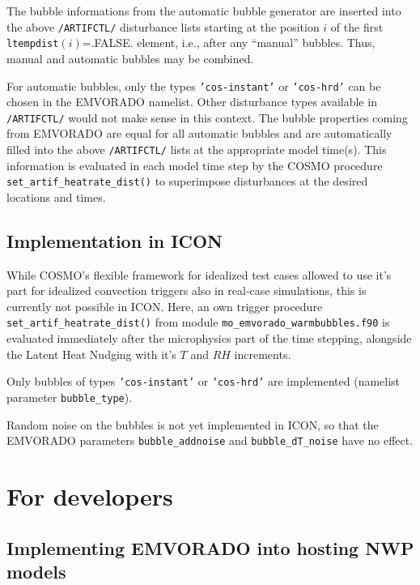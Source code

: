 \documentclass[10pt,a4paper,twoside,headinclude,footinclude,parskip=half]{scrartcl}
\newcommand{\myaktuellesection}{sec:intro}%
\newcommand{\labelsec}[1]{\label{#1}\renewcommand{\myaktuellesection}{#1}}%
\newcommand{\labelsec}[1]{\label{#1}}%
\newcommand{\srcform}[1]{\mbox{\texttt{#1}}\xspace}%
\newcommand{\paramform}[1]{\mbox{\texttt{#1}}\xspace}%
\begin{document}
The bubble informations from the automatic bubble generator are inserted into the
above \srcform{/ARTIFCTL/} disturbance lists starting
at the position $i$ of the first \srcform{ltempdist$(i)$}=.FALSE. element, i.e., after any ``manual'' bubbles. Thus,
manual and automatic bubbles may be combined.

For automatic bubbles, only the types \srcform{'cos-instant'} or \srcform{'cos-hrd'} can be chosen in the EMVORADO namelist. Other disturbance
types available in \srcform{/ARTIFCTL/} would not make sense in this
context. The bubble properties coming from EMVORADO are equal for all automatic bubbles
and are automatically filled into the above \srcform{/ARTIFCTL/} lists at the appropriate model time(s).
This information is evaluated in each model time step by the COSMO procedure \srcform{set_artif_heatrate_dist()} to superimpose disturbances
at the desired locations and times.


\subsection{Implementation in ICON}
\labelsec{sec:warmbub:implicon}

While COSMO's flexible framework for idealized test cases allowed to use it's part for idealized
convection triggers also in real-case simulations, this is currently not possible in ICON.
Here, an own trigger procedure \srcform{set_artif_heatrate_dist()} from module \srcform{mo_emvorado_warmbubbles.f90} is evaluated immediately after the microphysics part of
the time stepping, alongside the Latent Heat Nudging with it's $T$ and $RH$ increments.

Only bubbles of types \srcform{'cos-instant'} or \srcform{'cos-hrd'} are implemented (namelist parameter \paramform{bubble_type}).

Random noise on the bubbles is not yet implemented in ICON, so that the EMVORADO parameters
\srcform{bubble_addnoise} and \srcform{bubble_dT_noise} have no effect.

\clearpage

\section{For developers}

\labelsec{sec:devel}


\subsection{Implementing EMVORADO into hosting NWP models}
\end{document}
